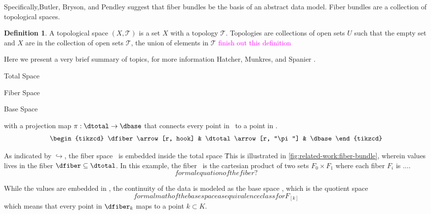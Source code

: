 \documentclass[10pt,journal,compsoc]{IEEEtran}
\newcommand{\note}[1]{\textcolor{magenta}{#1}}
\theoremstyle{definition}
\newtheorem{definition}{Definition}[section]
\theoremstyle{remark}
\begin{document}
Specifically,Butler, Bryson, and Pendley suggest that fiber bundles be the basis of an abstract data model. Fiber bundles are a collection of topological spaces. 
\begin{definition}
A topological space $(X, \mathscr{T})$ is a set $X$ with a topology $\mathscr{T}$. Topologies are collections of open sets $U$ such that the empty set and $X$ are in the collection of open sets $\mathscr{T}$, the union of elements in $\mathscr{T}$ \note{finish out this definition}
\end{definition}

Here we present a very brief summary of topics, for more information Hatcher\cite{hatcherAlgebraicTopology2002}, Munkres\cite{munkresElementsAlgebraicTopology1984}, and Spanier \cite{spanier1989algebraic}. 

\begin{LaTeXdescription}
  \item[\textcolor{total}{Total Space} \dtotal]
  \item[\textcolor{fiber}{Fiber Space} \dfiber]
  \item[\textcolor{base}{Base Space} \dbase]  
\end{LaTeXdescription}

with a projection map $\pi:\dtotal\rightarrow\dbase$ that connects every point in \dtotal\ to a point in \dbase. 
\begin{equation}
  \label{eq:fiber_bundle}
  \begin{tikzcd}
      \dfiber \arrow[r, hook] & \dtotal \arrow[r, "\pi"] & \dbase
  \end{tikzcd}
\end{equation}

As indicated by $\hookrightarrow$, the fiber space \dfiber\ is embedded inside the total space \dtotal\. This is illustrated in \autoref{fig:related-work:fiber-bundle}, wherein values lives in the fiber $\dfiber\subseteq\dtotal$. In this example, the fiber \dfiber\ is the cartesian product of two sets $F_{0}\times F_{1}$ where each fiber $F_{i}$ is ....
\begin{equation}
  formal equation of the fiber?
  \label{eq:related-work:fiber}
\end{equation}

While the values are embedded in \dfiber, the continuity of the data is modeled as the base space \dbase, which is the quotient space \cite{QuotientSpaceTopology2020}
\begin{equation}
formal math of the base space as equivalence class for F_[k]
\end{equation}
which means that every point in $\dfiber_{k}$ maps to a point $k \subset K$. 
\end{document}
